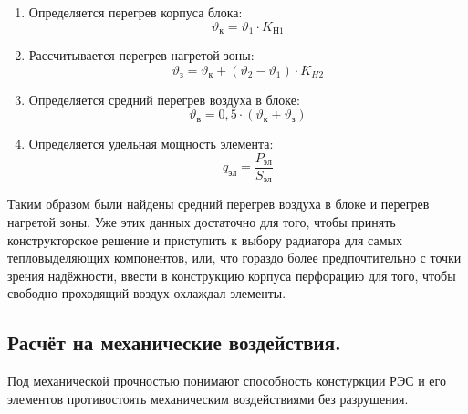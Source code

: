 \begin{enumerate}
\item Определяется перегрев корпуса блока:
%
  \begin{equation}
    \vartheta_к = \vartheta_1 \cdot K_{Н1}
  \end{equation}

\item Рассчитывается перегрев нагретой зоны:
%
\begin{equation}
  \vartheta_з = \vartheta_к + (\vartheta_2 - \vartheta_1) \cdot K_{H2}
\end{equation}

\item Определяется средний перегрев воздуха в блоке:
%
\begin{equation}
  \vartheta_в = 0,5 \cdot (\vartheta_к + \vartheta_з)
\end{equation}

\item Определяется удельная мощность элемента:
  \begin{equation}
    q_{эл} = \frac{P_{эл}}{S_{эл}}
  \end{equation}

\end{enumerate}

Таким образом были найдены средний перегрев воздуха в блоке и перегрев
нагретой зоны. Уже этих данных достаточно для того, чтобы принять
конструкторское решение и приступить к выбору радиатора для самых
тепловыделяющих компонентов, или, что гораздо более предпочтительно с
точки зрения надёжности, ввести в конструкцию корпуса перфорацию для
того, чтобы свободно проходящий воздух охлаждал элементы.

\subsection{Расчёт на механические воздействия. }


Под механической прочностью понимают способность констуркции РЭС и его
элементов противостоять механическим воздействиями без разрушения.

